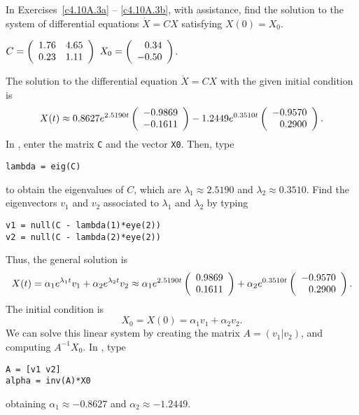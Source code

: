 \documentclass{ximera}
\begin{document}
\noindent In Exercises~\ref{c4.10A.3a} -- \ref{c4.10A.3b}, with \Matlab
assistance, find the solution to the system of differential equations
$\dot{X} = CX$ satisfying $X(0)=X_0$.
\begin{computerExercise}  \label{c4.10A.3a}
$C = \left(\begin{array}{rr} 1.76 & 4.65\\ 0.23 &1.11\end{array}\right)$ \AND $X_0 = \left(\begin{array}{r} 0.34 \\ -0.50\end{array}\right)$.

\begin{solution}
\ans The solution to the differential equation $\dot{X}
= CX$ with the given initial condition is
\[
X(t) \approx 0.8627e^{2.5190t}\left(\begin{array}{r} -0.9869 \\ -0.1611\end{array}\right)
- 1.2449e^{0.3510t}\left(\begin{array}{r} -0.9570 \\ 0.2900\end{array}\right).
\]
\soln In \Matlabp, enter the matrix {\tt C} and the vector {\tt X0}.  Then,
type
\begin{verbatim}
lambda = eig(C)
\end{verbatim}
to obtain the eigenvalues of $C$, which are
$\lambda_1 \approx 2.5190$ and $\lambda_2 \approx 0.3510$.  Find the
eigenvectors $v_1$ and $v_2$ associated to $\lambda_1$ and $\lambda_2$
by typing
\begin{verbatim}
v1 = null(C - lambda(1)*eye(2))
v2 = null(C - lambda(2)*eye(2))
\end{verbatim}
Thus, the general solution is
\[
X(t) = \alpha_1e^{\lambda_1 t}v_1 + \alpha_2e^{\lambda_2 t}v_2
\approx \alpha_1e^{2.5190t}\left(\begin{array}{r} 0.9869 \\ 0.1611\end{array}\right) +
\alpha_2e^{0.3510t}\left(\begin{array}{r} -0.9570 \\ 0.2900\end{array}\right).
\]
The initial condition is
\[
X_0 = X(0) = \alpha_1v_1 + \alpha_2v_2.
\]
We can solve this linear system by creating the matrix $A = (v_1|v_2)$, and
computing $A^{-1}X_0$.  In \Matlabp, type
\begin{verbatim}
A = [v1 v2]
alpha = inv(A)*X0
\end{verbatim}
obtaining $\alpha_1 \approx -0.8627$ and $\alpha_2 \approx -1.2449$.


\end{solution}
\end{computerExercise}
\end{document}

